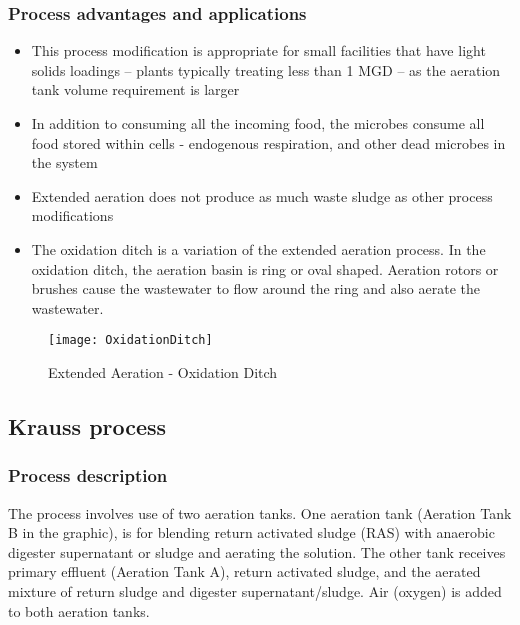 \subsubsection{Process advantages and applications}
\begin{itemize}
\item This process modification is appropriate for small facilities that have light solids loadings – plants typically treating less than 1 MGD – as the aeration tank volume requirement is larger
\item In addition to consuming all the incoming food, the microbes consume all food stored within cells - endogenous respiration, and other dead microbes in the system
\item Extended aeration does not produce as much waste sludge as other process modifications
\item The oxidation ditch is a variation of the extended aeration process.  In the oxidation ditch, the aeration basin is ring or oval shaped.  Aeration rotors or brushes cause the wastewater to flow around the ring and also aerate the wastewater.
\end{itemize}

\begin{figure}[h!]
\begin{center}
\texttt{[image: OxidationDitch]}
\caption{Extended Aeration - Oxidation Ditch}
\end{center}
\end{figure}
\newpage

		\subsection{Krauss process}


\subsubsection{Process description}
\noindent The process involves use of two aeration tanks.  One aeration tank (Aeration Tank B in the graphic), is for blending return activated sludge (RAS) with anaerobic digester supernatant or sludge and aerating the solution.  The other tank receives primary effluent (Aeration Tank A), return activated sludge, and the aerated mixture of return sludge and digester supernatant/sludge.  Air (oxygen) is added to both aeration tanks.\\

